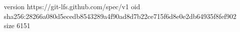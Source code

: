 version https://git-lfs.github.com/spec/v1
oid sha256:28266a080d5ecedb8543289a4f90ad8d7b22ce715f6d8e0e2db64935f8fef902
size 6151
